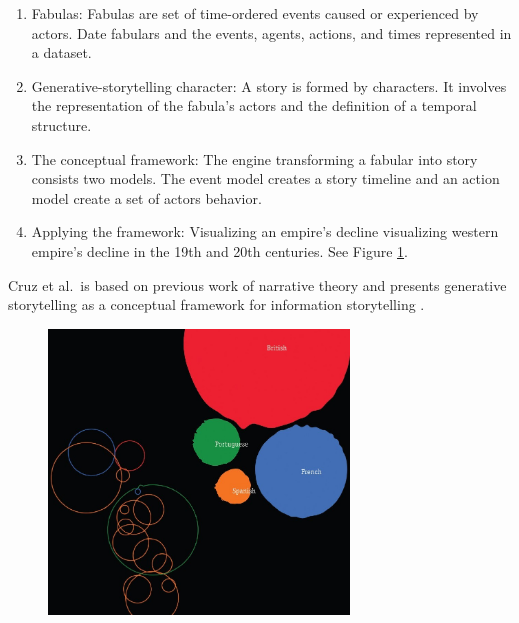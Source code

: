 \documentclass{egpubl}
\begin{document}
\begin{enumerate}
\item Fabulas: Fabulas are set of time-ordered events caused or experienced by actors. Date fabulars and the events, agents, actions, and times represented in a dataset.
\item Generative-storytelling character: A story is formed by characters. It involves the representation of the fabula's actors and the definition of a temporal structure.
\item The conceptual framework: The engine transforming a fabular into story consists two models. The event model creates a story timeline and an action model create a set of actors behavior.
\item Applying the framework: Visualizing an empire's decline visualizing western empire's decline in the 19th and 20th centuries. See Figure \ref{cruz2011}.
\end{enumerate}
Cruz et al.\ is based on  previous work of narrative theory\cite{naratology1985} and presents generative storytelling as a conceptual framework for information storytelling \cite{cruz2011}.

\begin{figure}
\begingroup
\centering
\includegraphics[width=8cm]{./images/cruz2011}
\label{cruz2011}
\endgroup
\end{figure}
\end{document}
